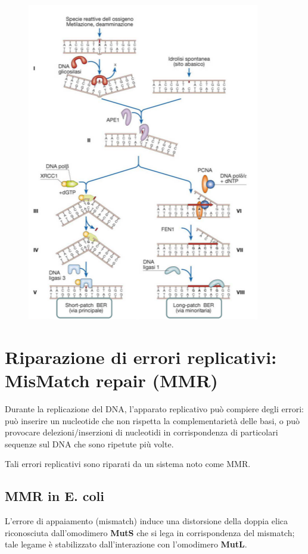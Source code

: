\documentclass[11pt]{book}
\begin{document}
\begin{figure}[htp]
\centering
\includegraphics[scale=0.6]{img/25_BER.png}
\caption{}
\label{ber}
\end{figure}

\section{Riparazione di errori replicativi: MisMatch repair
(MMR)}\label{riparazione-di-errori-replicativi-mismatch-repair-mmr}

Durante la replicazione del DNA, l'apparato replicativo può compiere
degli errori: può inserire un nucleotide che non rispetta la
complementarietà delle basi, o può provocare delezioni/inserzioni di
nucleotidi in corrispondenza di particolari sequenze sul DNA che sono
ripetute più volte.

Tali errori replicativi sono riparati da un sistema noto come MMR.

\subsection{MMR in E. coli}\label{mmr-in-e.-coli}

L'errore di appaiamento (mismatch) induce una distorsione della doppia
elica riconosciuta dall'omodimero \textbf{MutS} che si lega in
corrispondenza del mismatch; tale legame è stabilizzato dall'interazione
con l'omodimero \textbf{MutL}.
\end{document}
